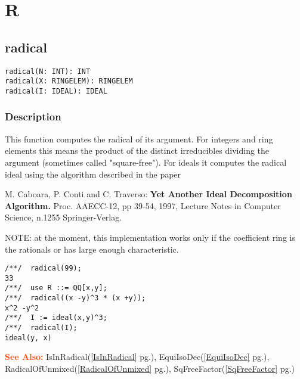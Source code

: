 \documentclass[a4paper]{mybook}
\newenvironment{command}{}{} %
\newcommand\SeeAlso{\par\textcolor{OrangeRed}{\textbf{\large See Also: }}}
\begin{document}
\chapter{R}  %
\label{R}

\section{radical}
\label{radical}
\begin{command} %


\begin{Verbatim}[label=syntax, rulecolor=\color{MidnightBlue},
frame=single]
radical(N: INT): INT
radical(X: RINGELEM): RINGELEM
radical(I: IDEAL): IDEAL
\end{Verbatim}


\subsection*{Description}

This function computes the radical of its argument.  For integers and
ring elements this means the product of the distinct irreducibles
dividing the argument (sometimes called "square-free").
For ideals it computes the radical ideal using the algorithm described
in the paper
\par 
  M. Caboara, P. Conti and C. Traverso: \textbf{Yet Another Ideal
  Decomposition Algorithm.} Proc. AAECC-12, pp 39-54, 1997, Lecture
  Notes in Computer Science, n.1255 Springer-Verlag.
\par 
NOTE: at the moment, this implementation works only if the coefficient
ring is the rationals or has large enough characteristic.
\begin{Verbatim}[label=example, rulecolor=\color{PineGreen}, frame=single]
/**/  radical(99);
33
/**/  use R ::= QQ[x,y];
/**/  radical((x -y)^3 * (x +y));
x^2 -y^2
/**/  I := ideal(x,y)^3;
/**/  radical(I);
ideal(y, x)
\end{Verbatim}


\SeeAlso %
  IsInRadical(\ref{IsInRadical} pg.\pageref{IsInRadical}), 
    EquiIsoDec(\ref{EquiIsoDec} pg.\pageref{EquiIsoDec}), 
    RadicalOfUnmixed(\ref{RadicalOfUnmixed} pg.\pageref{RadicalOfUnmixed}), 
    SqFreeFactor(\ref{SqFreeFactor} pg.\pageref{SqFreeFactor})
\end{command} %
\end{document}
